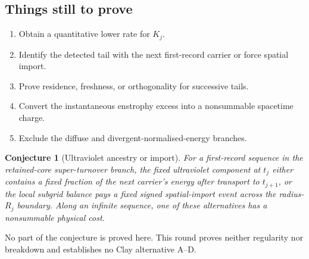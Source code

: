 \documentclass[11pt]{article}
\newtheorem{conjecture}[theorem]{Conjecture}
\theoremstyle{remark}
\begin{document}
\subsection*{Things still to prove}

\begin{enumerate}
\item Obtain a quantitative lower rate for \(K_j\).
\item Identify the detected tail with the next first-record carrier or force
spatial import.
\item Prove residence, freshness, or orthogonality for successive tails.
\item Convert the instantaneous enstrophy excess into a nonsummable
spacetime charge.
\item Exclude the diffuse and divergent-normalised-energy branches.
\end{enumerate}

\begin{conjecture}[Ultraviolet ancestry or import]
For a first-record sequence in the retained-core super-turnover branch, the
fixed ultraviolet component at \(t_j\) either contains a fixed fraction of
the next carrier's energy after transport to \(t_{j+1}\), or the local
subgrid balance pays a fixed signed spatial-import event across the
radius-\(R_j\) boundary.  Along an infinite sequence, one of these
alternatives has a nonsummable physical cost.
\end{conjecture}

No part of the conjecture is proved here.  This round proves neither
regularity nor breakdown and establishes no Clay alternative A--D.
\end{document}

